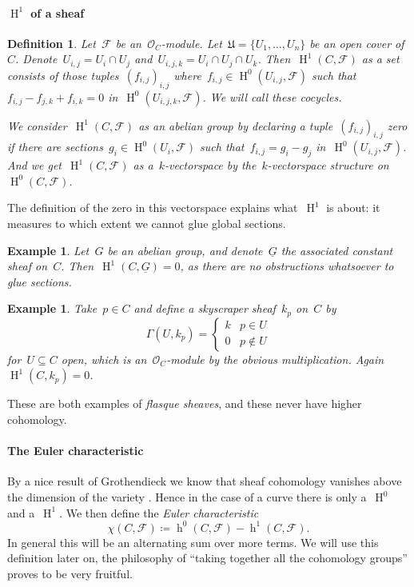\documentclass[10pt,a4paper]{article}
\theoremstyle{lecture}
\newtheorem{definition}[theorem]{Definition}
\newtheorem{example}[theorem]{Example}
\newcommand\dash{\nobreakdash-\hspace{0pt}}
\DeclareMathOperator\hh{h}
\DeclareMathOperator\HH{H}
\begin{document}
\paragraph{$\HH^1$ of a sheaf}
\begin{definition}
  Let~$\mathcal{F}$ be an~$\mathcal{O}_C$\dash module. Let~$\mathfrak{U}=\{U_1,\dotsc,U_n\}$ be an open cover of~$C$. Denote~$U_{i,j}=U_i\cap U_j$ and~$U_{i,j,k}=U_i\cap U_j\cap U_k$. Then~$\HH^1(C,\mathcal{F})$ \emph{as a set} consists of those tuples~$(f_{i,j})_{i,j}$ where~$f_{i,j}\in\HH^0(U_{i,j},\mathcal{F})$ such that~$f_{i,j}-f_{j,k}+f_{i,k}=0$ in~$\HH^0(U_{i,j,k},\mathcal{F})$. We will call these \emph{cocycles}.

  We consider~$\HH^1(C,\mathcal{F})$ \emph{as an abelian group} by declaring a tuple~$(f_{i,j})_{i,j}$ zero if there are sections~$g_i\in\HH^0(U_i,\mathcal{F})$ such that~$f_{i,j}=g_i-g_j$ in~$\HH^0(U_{i,j},\mathcal{F})$. And we get~$\HH^1(C,\mathcal{F})$ \emph{as a~$k$\dash vectorspace} by the~$k$\dash vectorspace structure on~$\HH^0(C,\mathcal{F})$.
\end{definition}
The definition of the zero in this vectorspace explains what~$\HH^1$ is about: it measures to which extent we cannot glue global sections.
\begin{example}
  Let~$G$ be an abelian group, and denote~$\underline{G}$ the associated constant sheaf on~$C$. Then~$\HH^1(C,\underline{G})=0$, as there are no obstructions whatsoever to glue sections.
\end{example}
\begin{example}
  Take~$p\in C$ and define a \emph{skyscraper sheaf}~$k_p$ on~$C$ by
  \begin{equation}
    \Gamma(U,k_p)=
    \begin{cases}
      k & p\in U \\
      0 & p\notin U
    \end{cases}
  \end{equation}
  for~$U\subseteq C$ open, which is an~$\mathcal{O}_C$\dash module by the obvious multiplication. Again~$\HH^1(C,k_p)=0$.
\end{example}
These are both examples of \emph{flasque sheaves}, and these never have higher cohomology.

\paragraph{The Euler characteristic}
By a nice result of Grothendieck we know that sheaf cohomology vanishes above the dimension of the variety \cite[theorem III.2.7]{hartshorne-algebraic-geometry}. Hence in the case of a curve there is only a~$\HH^0$ and a~$\HH^1$. We then define the \emph{Euler characteristic}
\begin{equation}
  \chi(C,\mathcal{F})\coloneqq\hh^0(C,\mathcal{F})-\hh^1(C,\mathcal{F}).
\end{equation}
In general this will be an alternating sum over more terms. We will use this definition later on, the philosophy of ``taking together all the cohomology groups'' proves to be very fruitful.
\end{document}
